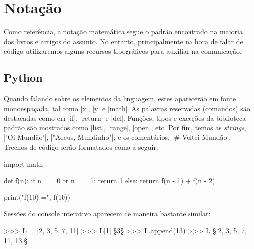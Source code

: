 \chapter*{Notação}%
	Como referência, a notação matemática segue o padrão encontrado na maioria dos livros e artigos do assunto. No entanto, principalmente na hora de falar de código utilizaremos alguns recursos tipográficos para auxiliar na comunicação. \par

	\section*{Python}%
	Quando falando sobre os elementos da linguagem, estes aparecerão em fonte monoespaçada, tal como |x|, |y| e |math|.
	As palavras reservadas (comandos) são destacadas como em |if|, |return| e |del|. Funções, tipos e exceções da biblioteca padrão são mostrados como |list|, |range|, |open|, etc. Por fim, temos as \textit{strings}, |'Oi Mundão'|, |"Adeus, Mundinho"|; e os comentários, |# Voltei Mundão|. Trechos de código serão formatados como a seguir:
	\begin{lstpython}
	import math

	def f(n):
		if n == 0 or n == 1:
			return 1
		else:
			return f(n - 1) + f(n - 2)

	print("f(10) =", f(10))
	\end{lstpython}
	Sessões do console interativo aparecem de maneira bastante similar:
	\begin{pyprompt}
	>>> L = [2, 3, 5, 7, 11]
	>>> L[1]
	§3§
	>>> L.append(13)
	>>> L
	§[2, 3, 5, 7, 11, 13]§
	\end{pyprompt}
